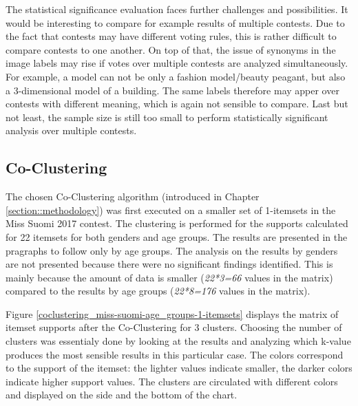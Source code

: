 The statistical significance evaluation faces further challenges and possibilities. It would be interesting to compare for example results of multiple contests. Due to the fact that contests may have different voting rules, this is rather difficult to compare contests to one another. On top of that, the issue of synonyms in the image labels may rise if votes over multiple contests are analyzed simultaneously. For example, a model can not be only a fashion model/beauty peagant, but also a 3-dimensional model of a building. The same labels therefore may apper over contests with different meaning, which is again not sensible to compare. Last but not least, the sample size is still too small to perform statistically significant analysis over multiple contests.

\subsection{Co-Clustering}
The chosen Co-Clustering algorithm (introduced in Chapter \ref{section::methodology}) was first executed on a smaller set of 1-itemsets in the Miss Suomi 2017 contest. The clustering is performed for the supports calculated for 22 itemsets for both genders and age groups. The results are presented in the pragraphs to follow only by age groups. The analysis on the results by genders are not presented because there were no significant findings identified. This is mainly because the amount of data is smaller (\emph{22*3=66} values in the matrix) compared to the results by age groups (\emph{22*8=176} values in the matrix). 

Figure \ref{coclustering_miss-suomi-age_groups-1-itemsets} displays the matrix of itemset supports after the Co-Clustering for 3 clusters. Choosing the number of clusters was essentialy done by looking at the results and analyzing which k-value produces the most sensible results in this particular case. The colors correspond to the support of the itemset: the lighter values indicate smaller, the darker colors indicate higher support values. The clusters are circulated with different colors and displayed on the side and the bottom of the chart. 

